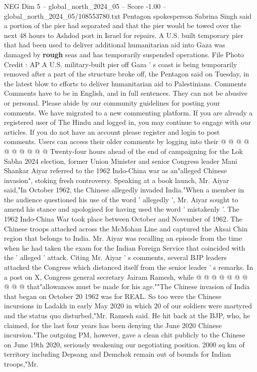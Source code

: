 \begin{textsample}{NEG Dim 5 – global\_north\_2024\_05 – Score -1.00 – global\_north\_2024\_05/108553780.txt}  \label{ex:f5_neg_287}
Pentagon spokesperson Sabrina Singh said a portion of the pier had separated and that the pier would be towed over the next 48 hours to Ashdod port in Israel for repairs.
A U.S. built temporary pier that had been used to deliver additional humanitarian aid into Gaza was damaged by \textbf{rough} seas and has temporarily suspended operations.
File Photo Credit : AP A U.S. military-built pier off Gaza ' s coast is being temporarily removed after a part of the structure broke off, the Pentagon said on Tuesday, in the latest blow to efforts to deliver humanitarian aid to Palestinians.
Comments Comments have to be in English, and in full sentences.
They can not be abusive or personal.
Please abide by our community guidelines for posting your comments.
We have migrated to a new commenting platform.
If you are already a registered user of The Hindu and logged in, you may continue to engage with our articles.
If you do not have an account please register and login to post comments.
Users can access their older comments by logging into their @ @ @ @ @ @ @ @ @ @ Twenty-four hours ahead of the end of campaigning for the Lok Sabha 2024 election, former Union Minister and senior Congress leader Mani Shankar Aiyar referred to the 1962 Indo-China war as an"alleged Chinese invasion", stoking fresh controversy.
Speaking at a book launch, Mr.
Aiyar said,"In October 1962, the Chinese allegedly invaded India."When a member in the audience questioned his use of the word ' allegedly ', Mr.
Aiyar sought to amend his stance and apologised for having used the word ' mistakenly '.
The 1962 Indo-China War took place between October and November of 1962.
The Chinese troops attacked across the McMohan Line and captured the Aksai Chin region that belongs to India.
Mr.
Aiyar was recalling an episode from the time when he had taken the exam for the Indian Foreign Service that coincided with the ' alleged ' attack.
Citing Mr.
Aiyar ' s comments, several BJP leaders attacked the Congress which distanced itself from the senior leader ' s remarks.
In a post on X, Congress general secretary Jairam Ramesh, while @ @ @ @ @ @ @ @ @ @ that"allowances must be made for his age.""The Chinese invasion of India that began on October 20 1962 was for REAL.
So too were the Chinese incursions in Ladakh in early May 2020 in which 20 of our soldiers were martyred and the status quo disturbed,"Mr.
Ramesh said.
He hit back at the BJP, who, he claimed, for the last four years has been denying the June 2020 Chinese incursion."The outgoing PM, however, gave a clean chit publicly to the Chinese on June 19th 2020, seriously weakening our negotiating position. 2000 sq km of territory including Depsang and Demchok remain out of bounds for Indian troops,"Mr.

\end{textsample}
